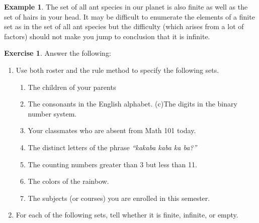 \documentclass[]{book}
\providecommand{\tightlist}{%
  \setlength{\itemsep}{0pt}\setlength{\parskip}{0pt}}
\theoremstyle{definition}
\theoremstyle{definition}
\newtheorem{example}{Example}[chapter]
\theoremstyle{definition}
\newtheorem{exercise}{Exercise}[chapter]
\theoremstyle{remark}
\begin{document}
\begin{example}
\protect\hypertarget{exm:unnamed-chunk-6}{}{\label{exm:unnamed-chunk-6} }The set of all ant species in our planet is also finite as well as the set of hairs in your head. It may be difficult to enumerate the elements of a finite set as in the set of all ant species but the difficulty (which arises from a lot of factors) should not make you jump to conclusion that it is infinite.
\end{example}

\begin{exercise}
\protect\hypertarget{exr:unnamed-chunk-7}{}{\label{exr:unnamed-chunk-7} }Answer the following:
\end{exercise}

\begin{enumerate}
\def\labelenumi{\arabic{enumi}.}
\tightlist
\item
  Use both roster and the rule method to specify the following sets.

  \begin{enumerate}
  \def\labelenumii{(\alph{enumii})}
  \tightlist
  \item
    The children of your parents
  \item
    The consonants in the English alphabet.
    (c)The digits in the binary number system.
  \item
    Your classmates who are absent from Math 101 today.
  \item
    The distinct letters of the phrase \emph{``kakaba kaba ka ba?''}
  \item
    The counting numbers greater than 3 but less than 11.
  \item
    The colors of the rainbow.
  \item
    The subjects (or courses) you are enrolled in this semester.
  \end{enumerate}
\item
  For each of the following sets, tell whether it is finite, infinite, or empty.


\end{enumerate}
\end{document}
